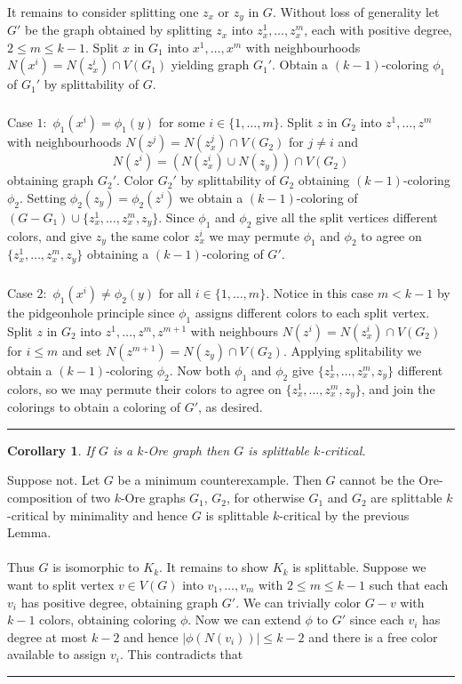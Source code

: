 \documentclass[letterpaper,12pt,oneside,onecolumn]{article}
\newenvironment{proof}{{\bf Proof:  }}{\hfill\rule{2mm}{2mm}}
\newtheorem{corollary}[fact]{Corollary}
\begin{document}
\begin{proof}
	\paragraph{}
	It remains to consider splitting one $z_x$ or $z_y$ in $G$. Without loss of generality let $G'$ be the graph obtained by splitting $z_x$ into $z_x^1, \dots, z_x^m$, each with positive degree, $2 \leq m \leq k-1$. Split $x$ in $G_1$ into $x^1, \dots, x^m$ with neighbourhoods $N(x^i) = N(z_x^i)\cap V(G_1)$ yielding graph $G_1'$. Obtain a $(k-1)$-coloring $\phi_1$ of $G_1'$ by splittability of $G$.
	\subparagraph{}Case $1:$ $\phi_1(x^i) = \phi_1(y)$ for some $i \in \{1,\dots, m\}$. Split $z$ in $G_2$ into $z^1,\dots, z^m$ with neighbourhoods $N(z^j) = N(z_x^j) \cap V(G_2)$ for $j \neq i$ and $$N(z^i) = (N(z_x^i) \cup N(z_y)) \cap V(G_2)$$
	obtaining graph $G_2'$. Color $G_2'$ by splittability of $G_2$ obtaining $(k-1)$-coloring $\phi_2$. Setting $\phi_2(z_y) = \phi_2(z^i)$ we obtain a $(k-1)$-coloring of $(G-G_1) \cup \{z_x^1, \dots, z_x^m, z_y\}$. Since $\phi_1$ and $\phi_2$ give all the split vertices different colors, and give $z_y$ the same color $z_x^i$ we may permute $\phi_1$ and $\phi_2$ to agree on $\{z_x^1, \dots, z_x^m, z_y\}$ obtaining a $(k-1)$-coloring of $G'$.
	\subparagraph{}Case $2:$ $\phi_1(x^i) \neq \phi_2(y)$ for all $i \in \{1,\dots, m\}$. Notice in this case $m < k-1$ by the pidgeonhole principle since $\phi_1$ assigns different colors to each split vertex. Split $z$ in $G_2$ into $z^1, \dots, z^m, z^{m+1}$ with neighbours $N(z^i) = N(z_x^i) \cap V(G_2)$ for $i \leq m$ and set $N(z^{m+1}) = N(z_y) \cap V(G_2)$. Applying splitability we obtain a $(k-1)$-coloring $\phi_2$. Now both $\phi_1$ and $\phi_2$ give $\{z_x^1, \dots, z_x^m, z_y\}$ different colors, so we may permute their colors to agree on $\{z_x^1, \dots, z_x^m, z_y\}$, and join the colorings to obtain a coloring of $G'$, as desired.
	\end{proof}
\begin{corollary}
	If $G$ is a $k$-Ore graph then $G$ is splittable $k$-critical.
\end{corollary}
\begin{proof}
	Suppose not. Let $G$ be a minimum counterexample. Then $G$ cannot be the Ore-composition of two $k$-Ore graphs $G_1$, $G_2$, for otherwise $G_1$ and $G_2$ are splittable $k$-critical by minimality and hence $G$ is splittable $k$-critical by the previous Lemma.
	\paragraph{}
	Thus $G$ is isomorphic to $K_k$. It remains to show $K_k$ is splittable. Suppose we want to split vertex $v \in V(G)$ into $v_1, \dots, v_m$ with $2\leq m \leq k-1$ such that each $v_i$ has positive degree, obtaining graph $G'$. We can trivially color $G - v$ with $k-1$ colors, obtaining coloring $\phi$. Now we can extend $\phi$ to $G'$ since each $v_i$ has degree at most $k-2$ and hence $|\phi(N(v_i))| \leq k-2$ and there is a free color available to assign $v_i$. This contradicts that
\end{proof}
\end{document}
